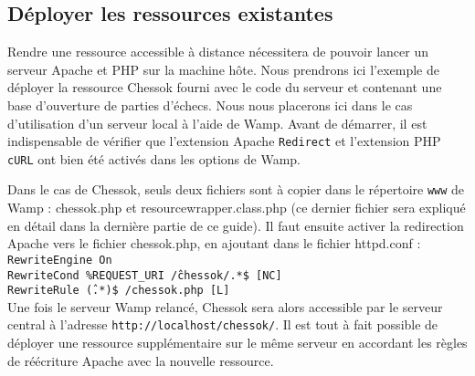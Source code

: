 \documentclass[a4paper,11pt]{article}
\begin{document}
\subsection{Déployer les ressources existantes}
Rendre une ressource accessible à distance nécessitera de pouvoir lancer un serveur Apache et PHP sur la machine hôte.
Nous prendrons ici l'exemple de déployer la ressource Chessok fourni avec le code du serveur et contenant une base d'ouverture de parties d'échecs.
Nous nous placerons ici dans le cas d'utilisation d'un serveur local à l'aide de Wamp.
Avant de démarrer, il est indispensable de vérifier que l'extension Apache {\tt Redirect} et l'extension PHP {\tt cURL} ont bien été activés dans les options de Wamp.
		
Dans le cas de Chessok, seuls deux fichiers sont à copier dans le répertoire {\tt www} de Wamp : chessok.php et resourcewrapper.class.php (ce dernier fichier sera expliqué en détail dans la dernière partie de ce guide).
Il faut ensuite activer la redirection Apache vers le fichier chessok.php, en ajoutant dans le fichier httpd.conf :
\\{\tt	RewriteEngine On\\
RewriteCond \%{REQUEST\_URI} \^/chessok/.*\$ [NC]\\
RewriteRule \^(.*)\$ /chessok.php [L] }\\
Une fois le serveur Wamp relancé, Chessok sera alors accessible par le serveur central à l'adresse {\tt http://localhost/chessok/}.
Il est tout à fait possible de déployer une ressource supplémentaire sur le même serveur en accordant les règles de réécriture Apache avec la nouvelle ressource.
		
\end{document}

